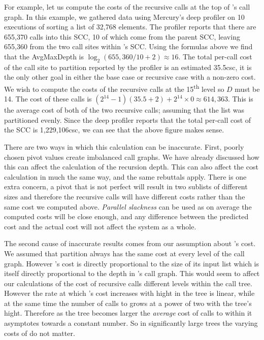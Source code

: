 For example, let us compute the costs of the recursive calls at the top of
\quicksortacc's call graph.
In this example, we gathered data using Mercury's deep profiler on 10
executions of \quicksortacc sorting a list of 32,768 elements.
The profiler reports that there are 655,370 calls into this SCC,
10 of which come from the parent SCC, leaving 655,360 from the two call sites
within \quicksortacc's SCC.
Using the formulas above we find that the AvgMaxDepth is
$\log_{2}(655,360/10 + 2) \approx 16$.
The total per-call cost of the call site to partition reported by the profiler
is an estimated 35.5csc,
it is the only other goal in either the base case or recursive case with a
non-zero cost.
We wish to compute the costs of the recursive calls at the
15\textsuperscript{th} level so $D$ must be 14.
The cost of these calls is
$(2^{14} - 1)(35.5 + 2) + 2^{14}\times0 \approx 614,363$.
This is the average cost of both of the two recursive calls;
assuming that the list was partitioned evenly.
Since the deep profiler reports that the total per-call cost of the
\quicksortacc SCC is 1,229,106csc, we can see that the above figure makes
sense.

There are two ways in which this calculation can be inaccurate.
First, poorly chosen pivot values create imbalanced call graphs.
We have already discussed how this can affect the calculation of the
recursion depth.
This can also affect the cost calculation in much the same way,
and the same rebuttals apply.
There is one extra concern,
a pivot that is not perfect will result in two sublists of different sizes
and therefore the recursive calls will have different costs rather than the
same cost we computed above.
\emph{Parallel slackness} can be used as on average the computed costs will
be close enough,
and any difference between the predicted cost and the actual cost will not
affect the system as a whole.

The second cause of inaccurate results comes from our assumption about
\partition's cost.
We assumed that partition always has the same cost at every level of
the call graph.
However \partition's cost is directly proportional to the size of its input
list which is itself directly proportional to the depth in \quicksortacc's call
graph.
This would seem to affect our calculations of the cost of recursive calls
different levels within the call tree.
However the rate at which \partition's cost increases with hight in the tree
is linear, while at the same time the number of calls to \partition grows at
a power of two with the tree's hight.
Therefore as the tree becomes larger the \emph{average} cost of calls to
\partition within it asymptotes towards a constant number.
So in significantly large trees the varying costs of \partition do not
matter.


